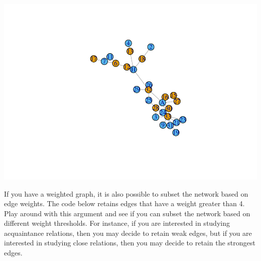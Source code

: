 \documentclass[
]{book}
\newenvironment{Shaded}{\begin{snugshade}}{\end{snugshade}}
\newcommand{\AttributeTok}[1]{\textcolor[rgb]{0.13,0.29,0.53}{#1}}
\newcommand{\CommentTok}[1]{\textcolor[rgb]{0.56,0.35,0.01}{\textit{#1}}}
\newcommand{\FunctionTok}[1]{\textcolor[rgb]{0.13,0.29,0.53}{\textbf{#1}}}
\newcommand{\NormalTok}[1]{#1}
\newcommand{\OtherTok}[1]{\textcolor[rgb]{0.56,0.35,0.01}{#1}}
\newcommand{\SpecialCharTok}[1]{\textcolor[rgb]{0.81,0.36,0.00}{\textbf{#1}}}
\newcommand{\StringTok}[1]{\textcolor[rgb]{0.31,0.60,0.02}{#1}}
\begin{document}
\begin{Shaded}
\end{Shaded}

\includegraphics{bookdown-demo_files/figure-latex/unnamed-chunk-49-1.pdf}

If you have a weighted graph, it is also possible to subset the network based on edge weights. The code below retains edges that have a weight greater than 4. Play around with this argument and see if you can subset the network based on different weight thresholds. For instance, if you are interested in studying acquaintance relations, then you may decide to retain weak edges, but if you are interested in studying close relations, then you may decide to retain the strongest edges.
\end{document}
